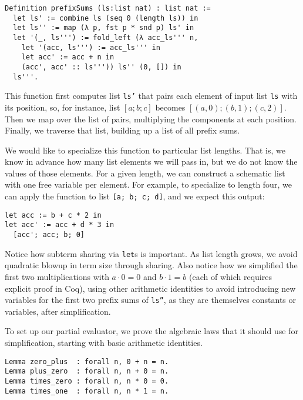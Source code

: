 \documentclass[sigplan,10pt,review,anonymous]{acmart}\settopmatter{printfolios=true,printccs=false,printacmref=false}
\newcommand{\todo}[1]{\textbf{TODO: #1}}
\begin{document}
\begin{verbatim}
Definition prefixSums (ls:list nat) : list nat :=
  let ls' := combine ls (seq 0 (length ls)) in
  let ls'' := map (λ p, fst p * snd p) ls' in
  let '(_, ls''') := fold_left (λ acc_ls''' n,
    let '(acc, ls''') := acc_ls''' in
    let acc' := acc + n in
    (acc', acc' :: ls''')) ls'' (0, []) in
  ls'''.
\end{verbatim}

This function first computes list \texttt{ls'} that pairs each element of input list \texttt{ls} with its position, so, for instance, list $[a; b; c]$ becomes $[(a, 0); (b, 1); (c, 2)]$.
Then we map over the list of pairs, multiplying the components at each position.
Finally, we traverse that list, building up a list of all prefix sums.

We would like to specialize this function to particular list lengths.
That is, we know in advance how many list elements we will pass in, but we do not know the values of those elements.
For a given length, we can construct a schematic list with one free variable per element.
For example, to specialize to length four, we can apply the function to list \texttt{[a; b; c; d]}, and we expect this output:
\begin{verbatim}
let acc := b + c * 2 in
let acc' := acc + d * 3 in
  [acc'; acc; b; 0]
\end{verbatim}

Notice how subterm sharing via \texttt{let}s is important.
As list length grows, we avoid quadratic blowup in term size through sharing.
Also notice how we simplified the first two multiplications with $a \cdot 0 = 0$ and $b \cdot 1 = b$ (each of which requires explicit proof in Coq), using other arithmetic identities to avoid introducing new variables for the first two prefix sums of \texttt{ls''}, as they are themselves constants or variables, after simplification.

To set up our partial evaluator, we prove the algebraic laws that it should use for simplification, starting with basic arithmetic identities.
\begin{verbatim}
Lemma zero_plus  : forall n, 0 + n = n.
Lemma plus_zero  : forall n, n + 0 = n.
Lemma times_zero : forall n, n * 0 = 0.
Lemma times_one  : forall n, n * 1 = n.
\end{verbatim}
\end{document}
